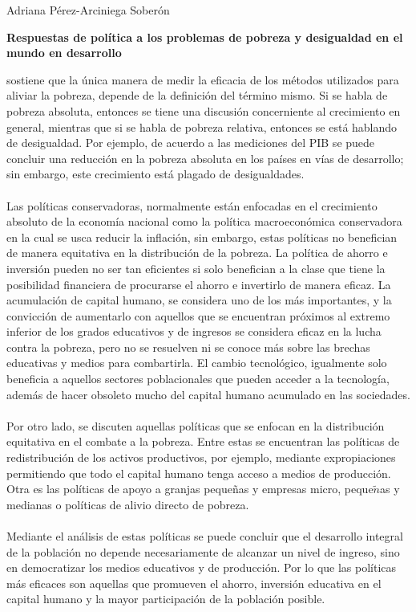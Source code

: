 \documentclass[11pt,spanish,letterpaper]{article}
\theoremstyle{plain}
\begin{document}
\begin{flushleft}
Adriana P\'erez-Arciniega Sober\'on
\end{flushleft}
\begin{center}
\textbf{Respuestas de pol\'itica a los problemas de pobreza y desigualdad en el mundo en desarrollo}
\end{center}
\cite{berry2003respuestas} sostiene que la \'unica manera de medir la eficacia de los m\'etodos utilizados para aliviar la pobreza, depende de la definici\'on del t\'ermino mismo. Si se habla de pobreza absoluta, entonces se tiene una discusi\'on concerniente al crecimiento en general, mientras que si se habla de pobreza relativa, entonces se est\'a hablando de desigualdad. Por ejemplo, de acuerdo a las mediciones del PIB se puede concluir una reducci\'on en la pobreza absoluta en los pa\'ises en v\'ias de desarrollo; sin embargo, este crecimiento est\'a plagado de desigualdades.\\
\\
Las pol\'iticas conservadoras, normalmente est\'an enfocadas en el crecimiento absoluto de la econom\'ia nacional como la pol\'itica macroecon\'omica conservadora en la cual se usca reducir la inflaci\'on, sin embargo, estas pol\'iticas no benefician de manera equitativa en la distribuci\'on de la pobreza. La pol\'itica de ahorro e inversi\'on pueden no ser tan eficientes si solo benefician a la clase que tiene la posibilidad financiera de procurarse el ahorro e invertirlo de manera eficaz. La acumulaci\'on de capital humano, se considera uno de los m\'as importantes, y la convicci\'on de aumentarlo con aquellos que se encuentran pr\'oximos al extremo inferior de los grados educativos y de ingresos se considera eficaz en la lucha contra la pobreza, pero no se resuelven ni se conoce m\'as sobre las brechas educativas y medios para combartirla. El cambio tecnol\'ogico, igualmente solo beneficia a aquellos sectores poblacionales que pueden acceder a la tecnolog\'ia, adem\'as de hacer obsoleto mucho del capital humano acumulado en las sociedades.\\
\\
Por otro lado, se discuten aquellas pol\'iticas que se enfocan en la distribuci\'on equitativa en el combate a la pobreza. Entre estas se encuentran las pol\'iticas de redistribuci\'on de los activos productivos, por ejemplo, mediante expropiaciones permitiendo que todo el capital humano tenga acceso a medios de producci\'on. Otra es las pol\'iticas de apoyo a granjas pequeñas y empresas micro, peque$\tilde{n}$as y medianas o pol\'iticas de alivio directo de pobreza.\\
\\
Mediante el an\'alisis de estas pol\'iticas se puede concluir que el desarrollo integral de la poblaci\'on no depende necesariamente de alcanzar un nivel de ingreso, sino en democratizar los medios educativos y de producci\'on. Por lo que las pol\'iticas m\'as eficaces son aquellas que promueven el ahorro, inversi\'on educativa en el capital humano y la mayor participaci\'on de la poblaci\'on posible. 


\end{document}
